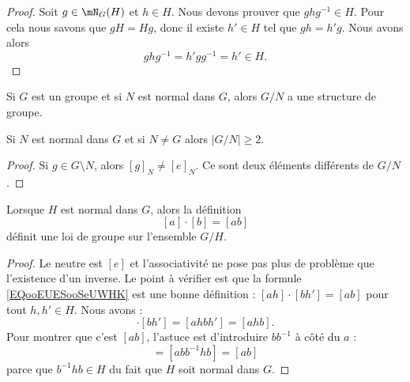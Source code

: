 \begin{proof}
	Soit \( g\in\mN_G(H)\) et \( h\in H\). Nous devons prouver que \( ghg^{-1}\in H\). Pour cela nous savons que \( gH=Hg\), donc il existe \( h'\in H\) tel que \( gh=h'g\). Nous avons alors
	\begin{equation}
		ghg^{-1}=h'gg^{-1}=h'\in H.
	\end{equation}
\end{proof}

\begin{proposition}	\label{PROPooYABYooOsIwYw}
	Si \( G\) est un groupe et si \( N\) est normal dans \( G\), alors \( G/N\) a une structure de groupe.
\end{proposition}


\begin{lemma}	\label{LEMooZJAQooARqTCG}
	Si \( N\) est normal dans \( G\) et si \( N\neq G\) alors \( | G/N |\geq 2\).
\end{lemma}

\begin{proof}
	Si \( g\in G\setminus N\), alors \( [g]_N\neq [e]_N\). Ce sont deux éléments différents de \( G/N\).
\end{proof}



\begin{lemma}       \label{LEMooFNVRooRCkjLc}
	Lorsque \( H\) est normal dans \( G\), alors la définition
	\begin{equation}        \label{EQooEUESooSeUWHK}
		[a]\cdot[b]=[ab]
	\end{equation}
	définit une loi de groupe sur l'ensemble \( G/H\).
\end{lemma}

\begin{proof}
	Le neutre est \( [e]\) et l'associativité ne pose pas plus de problème que l'existence d'un inverse. Le point à vérifier est que la formule \eqref{EQooEUESooSeUWHK} est une bonne définition : \( [ah]\cdot [bh']=[ab]\) pour tout \( h,h'\in H\). Nous avons :
	\begin{equation}
		[ah]\cdot [bh']=[ahbh']=[ahb].
	\end{equation}
	Pour montrer que c'est \( [ab]\), l'astuce est d'introduire \( bb^{-1}\) à côté du \( a\) :
	\begin{equation}
		[ahb]=[abb^{-1}hb]=[ab]
	\end{equation}
	parce que \( b^{-1} hb\in H\) du fait que \( H\) soit normal dans \( G\).
\end{proof}


